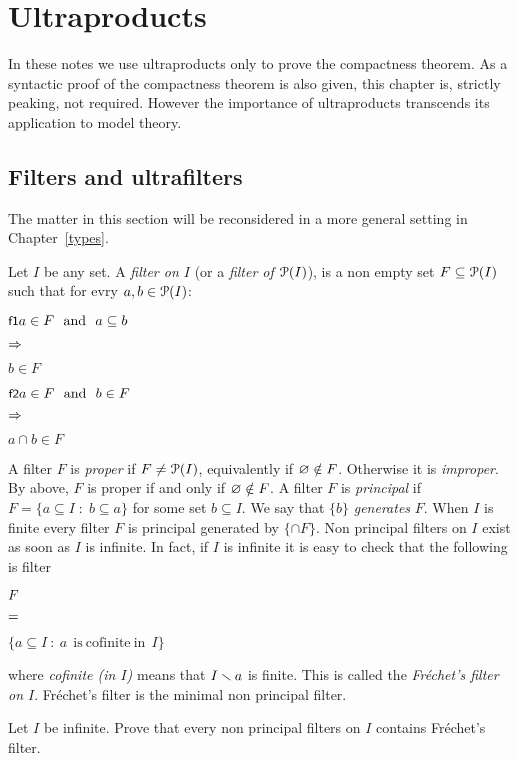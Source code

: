 \documentclass[creche.tex]{subfiles}
\begin{document}
\chapter{Ultraproducts}
\label{ultraprodotti}

\def\medrel#1{\parbox[t]{6ex}{$\displaystyle\hfil #1$}}
\def\ceq#1#2#3{\parbox{25ex}{$\displaystyle #1$}\medrel{#2}$\displaystyle  #3$}

In these notes we use ultraproducts only to prove the compactness theorem. As a syntactic proof of the compactness theorem is also given, this chapter is, strictly peaking, not required. However the importance of ultraproducts transcends its application to model theory.


\section{Filters and ultrafilters}\label{ultrafiltri}

The matter in this section will be reconsidered in a more general setting in Chapter~\ref{types}.

Let $I$ be any set. A \emph{filter on $I$\/} (or a \emph{filter of $\P(I)$}), is a non empty set $F\subseteq \P(I)$ such that for evry $a, b\in \P(I)$:

\ceq{\ssf{f1}\hfill a\in F\ \ \textrm{and}\ \ a\subseteq b}{\IMP}{b\in F}

\ceq{\ssf{f2}\hfill a\in F\ \ \textrm{and}\ \ b\in F}{\IMP}{a\cap b\in F}

A filter $F$ is \emph{proper\/} if $F\neq\P(I)$, equivalently if $\0\notin F$. Otherwise it is \emph{improper}. By  above, $F$ is proper if and only if $\0\notin F$. A filter $F$ is \emph{principal\/} if $F=\{a\subseteq I\; :\; b\subseteq a\}$ for some set $b\subseteq I$. We say that $\{b\}$ \emph{generates\/} $F$. When $I$ is finite every filter $F$ is principal generated by $\{\cap F\}$. Non principal filters on $I$ exist as soon as $I$ is infinite. In fact, if $I$ is infinite it is easy to check that the following is filter

\ceq{\hfill F}{=}{\Big\{a\subseteq I\ :\ a \ \mathrm{\ is\ cofinite\ in\ }\ I\Big\}}

where \emph{cofinite (in $I$)} means that $I\sm a$ is finite. This is called the \emph{Fr\'echet's filter on $I$}. Fr\'echet's filter is the minimal non principal filter.

\begin{exercise}
Let $I$ be infinite. Prove that every non principal filters on $I$ contains Fr\'echet's filter.\QED
\end{exercise}
\end{document}
